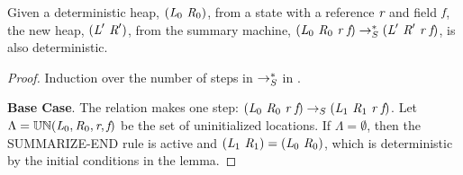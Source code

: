 \begin{lemma}
\label{lem:S-determ}
Given a deterministic heap, $(\cfgnt{L}_0\ \cfgnt{R}_0)$, from a
state with a reference $\emph{r}$ and field $\emph{f}$, the
new heap, $(\emph{L}^\prime\ \emph{R}^\prime)$, from the 
summary machine, $(\cfgnt{L}_0\ \cfgnt{R}_0\ \cfgnt{r}\ \cfgnt{f})
\rsum^*
(\cfgnt{L}^\prime\ \cfgnt{R}^\prime\ \cfgnt{r}\ \cfgnt{f})$, is also deterministic.
\end{lemma}
\begin{proof}
Induction over the number of steps in $\rightarrow_S^*$ in .

\noindent\textbf{Base Case}. The relation makes one step: $(\emph{L}_0\ \emph{R}_0\ \emph{r}\ \emph{f})
\rightarrow_S
(\emph{L}_1\ \emph{R}_1\ \emph{r}\ \emph{f})$. Let $\Lambda = \mathbb{UN}(\emph{L}_0, \emph{R}_0, \emph{r},
\emph{f})$ be the set of uninitialized locations. If $\Lambda = \emptyset$, then the \textrm{S{\footnotesize UMMARIZE-END}}
rule is active and $(\emph{L}_1\ \emph{R}_1) = (\emph{L}_0\ \emph{R}_0)$, which is deterministic by the initial conditions in the lemma.


\end{proof}
